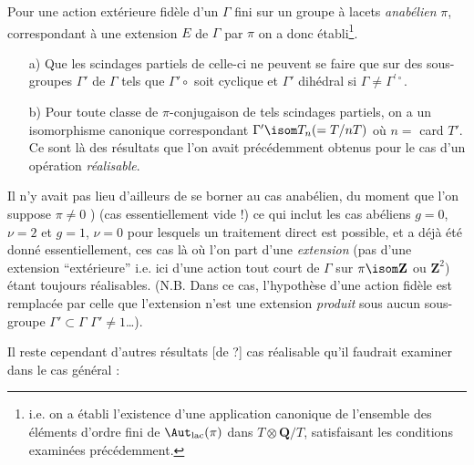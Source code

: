 Pour une action extérieure fidèle d'un $\Gamma$ fini sur un groupe à lacets \emph{anabélien} $\pi$, correspondant à une extension $E$ de $\Gamma$ par $\pi$ on a donc établi\footnote{i.e. on a établi l'existence d'une application canonique de l'ensemble des éléments d'ordre fini de $\Aut_{\text{lac}}(\pi)$ dans $T \otimes \mathbf{Q}/T$, satisfaisant les conditions examinées précédemment.}.
\begin{enumerate}
    \item[a)] Que les scindages partiels de celle-ci ne peuvent se faire que sur des sous-groupes $\Gamma'$ de $\Gamma$ tels que $\Gamma{'\circ}$ soit cyclique et $\Gamma'$ dihédral si $\Gamma \neq \Gamma^{'\circ}$.
    \item[b)] Pour toute classe de $\pi$-conjugaison de tels scindages partiels, on a un isomorphisme canonique correspondant $\Gamma' \isom T_n( = T/nT)$ où $n =$ card $T'$. Ce sont là des résultats que l'on avait précédemment obtenus pour le cas d'un opération \emph{réalisable}. 
\end{enumerate}
Il n'y avait pas lieu d'ailleurs de se borner au cas anabélien, du moment que l'on suppose $\pi \neq 0$ ) (cas essentiellement vide !) ce qui inclut les cas abéliens $g = 0$, $\nu = 2$ et $g = 1$, $\nu = 0$ pour lesquels un traitement direct est possible, et a déjà été donné essentiellement, ces cas là où l'on part d'une \emph{extension} (pas d'une extension ``extérieure'' i.e. ici d'une action tout court de $\Gamma$ sur $\pi \isom \mathbf{Z}$ ou $\mathbf{Z}^2$) étant toujours réalisables. (N.B. Dans ce cas, l'hypothèse d'une action fidèle est remplacée par celle que l'extension n'est une extension \emph{produit} sous aucun sous-groupe $\Gamma' \subset  \Gamma$ $\Gamma' \neq 1$\dots).

Il reste cependant d'autres résultats [de ?] cas réalisable qu'il faudrait examiner dans le cas général :

